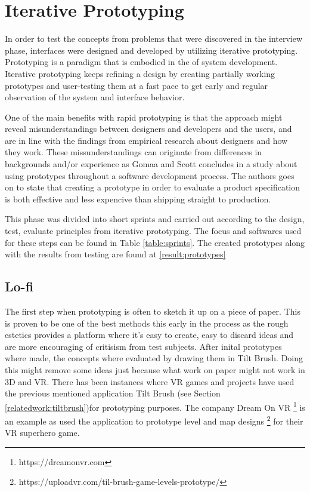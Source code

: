 \section{Iterative Prototyping}
\label{method:prototype}
In order to test the concepts from problems that were discovered in the interview phase, interfaces were designed and developed by utilizing iterative prototyping. Prototyping is a paradigm that is embodied in the  of system development\cite{proto:Gomaa1981}. Iterative prototyping keeps refining a design by creating partially working prototypes and user-testing them at a fast pace to get early and regular observation of the system and interface behavior\cite{proto:hartson2012ux}.

One of the main benefits with rapid prototyping is that the approach might reveal misunderstandings between designers and developers and the users, and are in line with the findings from empirical research about designers and how they work\cite{proto:tripp1990rapid}. These missunderstandings can originate from differences in backgrounds and/or experience as Gomaa and Scott concludes in a study about using prototypes throughout a software development process.\cite{proto:Lichter1993} The authors goes on to state that creating a prototype in order to evaluate a product specification is both effective and less expencive than shipping straight to production.

This phase was divided into short sprints and carried out according to the design, test, evaluate principles from iterative prototyping.\cite{proto:hartson2012ux} The focus and softwares used for these steps can be found in Table \ref{table:sprints}. The created prototypes along with the results from testing are found at \ref{result:prototypes}

\subsection{Lo-fi}
\label{method:prototype:lofi}
The first step when prototyping is often to sketch it up on a piece of paper. This is proven to be one of the best methods this early in the process as the rough estetics provides a platform where it's easy to create, easy to discard ideas and are more encouraging of critisism from test subjects. \cite{proto:boling1997holistic} After inital prototypes where made, the concepts where evaluated by drawing them in Tilt Brush. Doing this might remove some ideas just because what work on paper might not work in 3D and VR. There has been instances where VR games and projects have used the previous mentioned application Tilt Brush (see Section \ref{relatedwork:tiltbrush})for prototyping purposes. The company Dream On VR \footnote{https://dreamonvr.com} is an example as used the application to prototype level and map designs \footnote{https://uploadvr.com/til-brush-game-levels-prototype/} for their VR superhero game.

